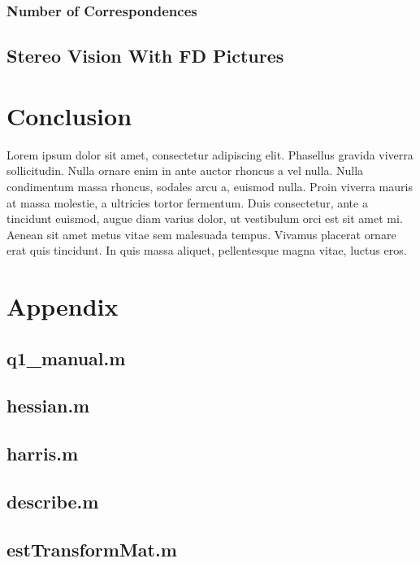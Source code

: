 \documentclass[a4paper, 10pt, conference]{ieeeconf}
\begin{document}
\subsubsection{Number of Correspondences}

\subsection{Stereo Vision With FD Pictures}


\cite{notes}


\section{Conclusion}
Lorem ipsum dolor sit amet, consectetur adipiscing elit. Phasellus gravida viverra sollicitudin. Nulla ornare enim in ante auctor rhoncus a vel nulla. Nulla condimentum massa rhoncus, sodales arcu a, euismod nulla. Proin viverra mauris at massa molestie, a ultricies tortor fermentum. Duis consectetur, ante a tincidunt euismod, augue diam varius dolor, ut vestibulum orci est sit amet mi. Aenean sit amet metus vitae sem malesuada tempus. Vivamus placerat ornare erat quis tincidunt. In quis massa aliquet, pellentesque magna vitae, luctus eros.




\onecolumn
\section*{Appendix}

\subsection*{q1\_manual.m}

\newpage

\subsection*{hessian.m}

\newpage

\subsection*{harris.m}

\newpage

\subsection*{describe.m}

\newpage

\subsection*{estTransformMat.m}

\newpage
\end{document}
